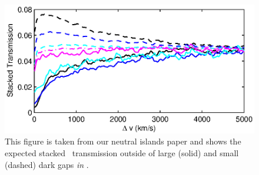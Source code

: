 \documentclass[11pt]{article}
\begin{document}
\begin{figure}[h]
  \centering
  \includegraphics[width=14cm]{fig7a.eps}
  \caption{This figure is taken from our neutral islands paper and shows the expected stacked \lya\ transmission outside of large (solid) and small (dashed) dark gaps \textit{in \lyb}. }
  \label{fig:todo}
\end{figure}
\end{document}
